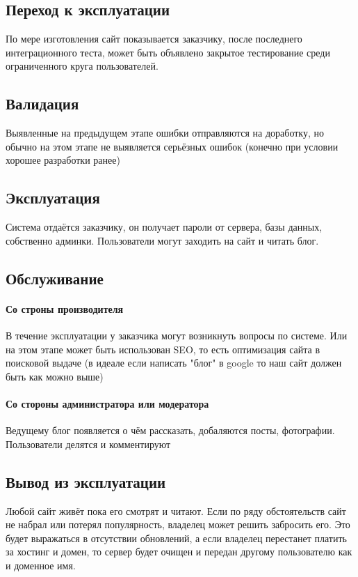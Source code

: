 \documentclass[bibliography=totocnumbered]{scrartcl}
\begin{document}
\subsection{Переход к эксплуатации}
По мере изготовления сайт показывается заказчику, после последнего интеграционного теста, может быть объявлено закрытое тестирование среди ограниченного круга пользователей.

\subsection{Валидация}
Выявленные на предыдущем этапе ошибки отправляются на доработку, но обычно на этом этапе не выявляется серьёзных ошибок (конечно при условии хорошее разработки ранее)

\subsection{Эксплуатация}
Система отдаётся заказчику, он получает пароли от сервера, базы данных, собственно админки. Пользователи могут заходить на сайт и читать блог.

\subsection{Обслуживание}

\paragraph{Со строны производителя}
В течение эксплуатации у заказчика могут возникнуть вопросы по системе. Или на этом этапе может быть использован SEO, то есть оптимизация сайта в поисковой выдаче (в идеале если написать "блог" в google то наш сайт должен быть как можно выше)

\paragraph{Со стороны администратора или модератора}
Ведущему блог появляется о чём рассказать, добаляются посты, фотографии. Пользователи делятся и комментируют

\subsection{Вывод из эксплуатации}

Любой сайт живёт пока его смотрят и читают. Если по ряду обстоятельств сайт не набрал или потерял популярность, владелец может решить забросить его. Это будет выражаться в отсутствии обновлений, а если владелец перестанет платить за хостинг и домен, то сервер будет очищен и передан другому пользователю как и доменное имя.
\end{document}
